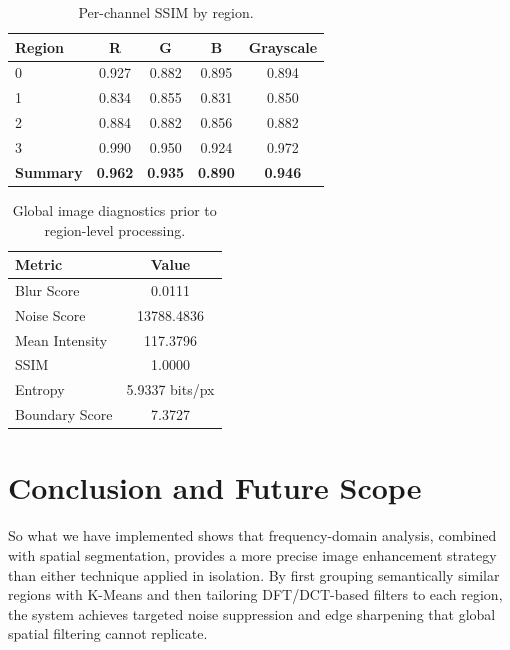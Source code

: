 \begin{table}[H]
\centering
\caption{Per-channel SSIM by region.}
\label{tab:ssim-channels}
\begin{tabular}{lcccc}
\toprule
\textbf{Region} & \textbf{R} & \textbf{G} & \textbf{B} & \textbf{Grayscale} \\
\midrule
0       & 0.927 & 0.882 & 0.895 & 0.894 \\
1       & 0.834 & 0.855 & 0.831 & 0.850 \\
2       & 0.884 & 0.882 & 0.856 & 0.882 \\
3       & 0.990 & 0.950 & 0.924 & 0.972 \\
\midrule
\textbf{Summary} & \textbf{0.962} & \textbf{0.935} & \textbf{0.890} & \textbf{0.946} \\
\bottomrule
\end{tabular}
\end{table}

\begin{table}[H]
\centering
\caption{Global image diagnostics prior to region-level processing.}
\label{tab:global-diag}
\begin{tabular}{lc}
\toprule
\textbf{Metric} & \textbf{Value} \\
\midrule
Blur Score      & 0.0111 \\
Noise Score     & 13788.4836 \\
Mean Intensity  & 117.3796 \\
SSIM            & 1.0000 \\
Entropy         & 5.9337 bits/px \\
Boundary Score  & 7.3727 \\
\bottomrule
\end{tabular}
\end{table}


\section{Conclusion and Future Scope}

So what we have implemented shows that frequency-domain analysis, combined with spatial
segmentation, provides a more precise image enhancement strategy than either technique
applied in isolation. By first grouping semantically similar regions with K-Means and then
tailoring DFT/DCT-based filters to each region, the system achieves targeted noise
suppression and edge sharpening that global spatial filtering cannot replicate.

